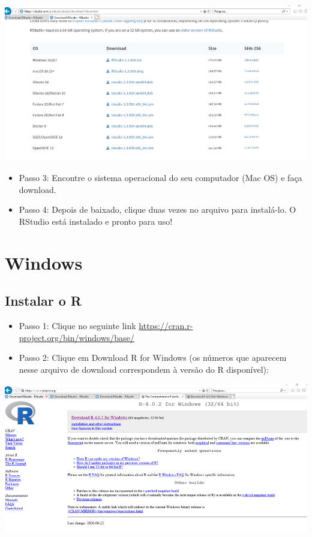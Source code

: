\documentclass[
  10pt,
  brazil,
  a4paper,
  twoside, notitlepage, openright]{book}
\providecommand{\tightlist}{%
  \setlength{\itemsep}{0pt}\setlength{\parskip}{0pt}}
\begin{document}
\includegraphics[width=13.54in]{img/inst_1_rstudio}

\begin{itemize}
\tightlist
\item
  Passo 3: Encontre o sistema operacional do seu computador (Mac OS) e faça download.\\
\item
  Passo 4: Depois de baixado, clique duas vezes no arquivo para instalá-lo. O RStudio está instalado e pronto para uso!
\end{itemize}

\hypertarget{windows}{%
\section{Windows}\label{windows}}

\hypertarget{instalar-o-r-2}{%
\subsection{Instalar o R}\label{instalar-o-r-2}}

\begin{itemize}
\tightlist
\item
  Passo 1: Clique no seguinte link \url{https://cran.r-project.org/bin/windows/base/}\\
\item
  Passo 2: Clique em Download R for Windows (os números que aparecem nesse arquivo de download correspondem à versão do R disponível):
\end{itemize}

\includegraphics[width=13.54in]{img/inst_1_rwindows}
\end{document}
